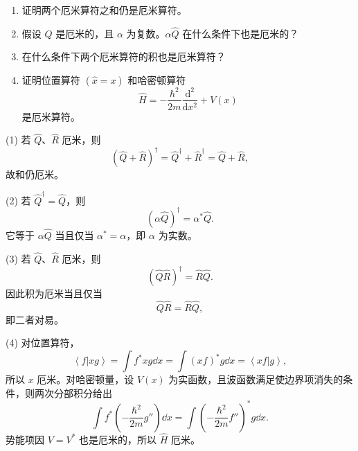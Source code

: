 \begin{question}
\begin{enumerate}
\item 证明两个厄米算符之和仍是厄米算符。
\item 假设 $\hat Q$ 是厄米的，且 $\alpha$ 为复数。$\alpha\hat Q$ 在什么条件下也是厄米的？
\item 在什么条件下两个厄米算符的积也是厄米算符？
\item 证明位置算符 $(\hat x=x)$ 和哈密顿算符
\[
\hat H=-\frac{\hbar^2}{2m}\frac{\mathrm d^2}{\mathrm dx^2}+V(x)
\]
是厄米算符。
\end{enumerate}
\end{question}
\begin{solution}
(1) 若 $\hat Q$、$\hat R$ 厄米，则
\[
(\hat Q+\hat R)^\dagger=\hat Q^\dagger+\hat R^\dagger=\hat Q+\hat R,
\]
故和仍厄米。

(2) 若 $\hat Q^\dagger=\hat Q$，则
\[
(\alpha\hat Q)^\dagger=\alpha^*\hat Q.
\]
它等于 $\alpha\hat Q$ 当且仅当 $\alpha^*=\alpha$，即 $\alpha$ 为实数。

(3) 若 $\hat Q$、$\hat R$ 厄米，则
\[
(\hat Q\hat R)^\dagger=\hat R\hat Q.
\]
因此积为厄米当且仅当
\[
\hat Q\hat R=\hat R\hat Q,
\]
即二者对易。

(4) 对位置算符，
\[
\left\langle f|xg \right\rangle=\int f^*xg\dd x=\int (xf)^*g\dd x=\left\langle xf|g \right\rangle,
\]
所以 $x$ 厄米。对哈密顿量，设 $V(x)$ 为实函数，且波函数满足使边界项消失的条件，则两次分部积分给出
\[
\int f^*\left(-\frac{\hbar^2}{2m}g''\right)\dd x
=\int \left(-\frac{\hbar^2}{2m}f''\right)^*g\dd x.
\]
势能项因 $V=V^*$ 也是厄米的，所以 $\hat H$ 厄米。
\end{solution}

